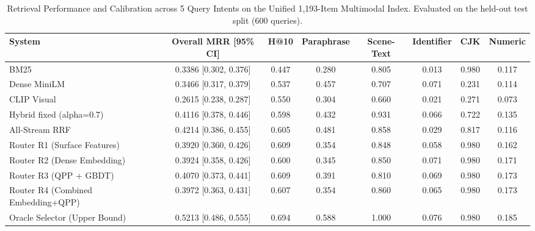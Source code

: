 \begin{table}[t]
\centering\small
\caption{Retrieval Performance and Calibration across 5 Query Intents on the Unified 1,193-Item Multimodal Index. Evaluated on the held-out test split (600 queries).}
\label{tab:mixed_intent_routing}
\begin{tabular}{lccccccc}
\toprule
System & Overall MRR [95\% CI] & H@10 & Paraphrase & Scene-Text & Identifier & CJK & Numeric \\
\midrule
BM25 & 0.3386 [0.302, 0.376] & 0.447 & 0.280 & 0.805 & 0.013 & 0.980 & 0.117 \\
Dense MiniLM & 0.3466 [0.317, 0.379] & 0.537 & 0.457 & 0.707 & 0.071 & 0.231 & 0.114 \\
CLIP Visual & 0.2615 [0.238, 0.287] & 0.550 & 0.304 & 0.660 & 0.021 & 0.271 & 0.073 \\
Hybrid fixed (alpha=0.7) & 0.4116 [0.378, 0.446] & 0.598 & 0.432 & 0.931 & 0.066 & 0.722 & 0.135 \\
All-Stream RRF & 0.4214 [0.386, 0.455] & 0.605 & 0.481 & 0.858 & 0.029 & 0.817 & 0.116 \\
Router R1 (Surface Features) & 0.3920 [0.360, 0.426] & 0.609 & 0.354 & 0.848 & 0.058 & 0.980 & 0.162 \\
Router R2 (Dense Embedding) & 0.3924 [0.358, 0.426] & 0.600 & 0.345 & 0.850 & 0.071 & 0.980 & 0.171 \\
Router R3 (QPP + GBDT) & 0.4070 [0.373, 0.441] & 0.609 & 0.391 & 0.810 & 0.069 & 0.980 & 0.173 \\
Router R4 (Combined Embedding+QPP) & 0.3972 [0.363, 0.431] & 0.607 & 0.354 & 0.860 & 0.065 & 0.980 & 0.173 \\
Oracle Selector (Upper Bound) & 0.5213 [0.486, 0.555] & 0.694 & 0.588 & 1.000 & 0.076 & 0.980 & 0.185 \\
\bottomrule
\end{tabular}
\end{table}
